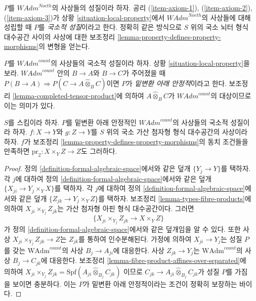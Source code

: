 \begin{remark}[뇌터 변형]
\label{remark-variant-Noetherian}
$P$를 $\textit{WAdm}^{Noeth}$의 사상들의 성질이라 하자. 공리
(\ref{item-axiom-1}), (\ref{item-axiom-2}), (\ref{item-axiom-3})가
상황 \ref{situation-local-property}에서 $\textit{WAdm}^{Noeth}$의
사상들에 대해 성립할 때 $P$를
{\it 국소적 성질}이라고 한다. %
정확히 같은 방식으로 $S$ 위의 국소 뇌터 형식 대수공간 사이의
사상에 대한 보조정리
\ref{lemma-property-defines-property-morphisms}의 변형을 얻는다.
\end{remark}

\begin{situation}
\label{situation-base-change-local-property}
$P$를 $\textit{WAdm}^{count}$의 사상들의 국소적 성질이라 하자.
상황 \ref{situation-local-property}을 보라.
$\textit{WAdm}^{count}$ 안의 $B \to A$와 $B \to C$가 주어졌을 때
$P(B \to A) \Rightarrow P(C \to A \widehat{\otimes}_B C)$이면
$P$가 {\it 밑변환 아래 안정적}이라고 한다. 보조정리
\ref{lemma-completed-tensor-product}에 의하여
$A \widehat{\otimes}_B C$가 $\textit{WAdm}^{count}$의 대상이므로
이는 의미가 있다.
\end{situation}

\begin{lemma}
\label{lemma-base-change-property-morphisms}
$S$를 스킴이라 하자. $P$를 밑변환 아래 안정적인
$\textit{WAdm}^{count}$의 사상들의 국소적 성질이라 하자.
$f : X \to Y$와 $g : Z \to Y$를 $S$ 위의 국소 가산 첨자형 형식
대수공간의 사상이라 하자. $f$가 보조정리
\ref{lemma-property-defines-property-morphisms}의 동치 조건들을
만족하면 $\text{pr}_2 : X \times_Y Z \to Z$도 그러하다.
\end{lemma}

\begin{proof}
정의 \ref{definition-formal-algebraic-space}에서와 같은 덮개
$\{Y_j \to Y\}$를 택하자. 각 $j$에 대하여 정의
\ref{definition-formal-algebraic-space}에서와 같은 덮개
$\{X_{ji} \to Y_j \times_Y X\}$를 택하자. 각 $j$에 대하여 정의
\ref{definition-formal-algebraic-space}에서와 같은 덮개
$\{Z_{jk} \to Y_j \times_Y Z\}$를 택하자. 보조정리
\ref{lemma-types-fibre-products}에 의하여
$X_{ji} \times_{Y_j} Z_{jk}$는 가산 첨자형 아핀 형식
대수공간이다. 그러면
$$
\{X_{ji} \times_{Y_j} Z_{jk} \to X \times_Y Z\}
$$
가 정의 \ref{definition-formal-algebraic-space}에서와 같은 덮개임을
알 수 있다. 또한 사상 $X_{ji} \times_{Y_j} Z_{jk} \to Z$는
$Z_{jk}$를 통하여 인수분해된다. 가정에 의하여
$X_{ji} \to Y_j$는 성질 $P$를 갖는 $\text{WAdm}^{count}$의 사상
$B_j \to A_{ji}$에 대응한다. 사상 $Z_{jk} \to Y_j$는
$\text{WAdm}^{count}$의 사상 $B_j \to C_{jk}$에 대응한다.
보조정리 \ref{lemma-fibre-product-affines-over-separated}에 의하여
$
X_{ji} \times_{Y_j} Z_{jk} =
\text{Spf}(A_{ji} \widehat{\otimes}_{B_j} C_{jk})
$
이므로 $C_{jk} \to A_{ji} \widehat{\otimes}_{B_j} C_{jk}$가
성질 $P$를 가짐을 보이면 충분하다. 이는 $P$가 밑변환 아래
안정적이라는 조건이 정확히 보장하는 바이다.
\end{proof}

